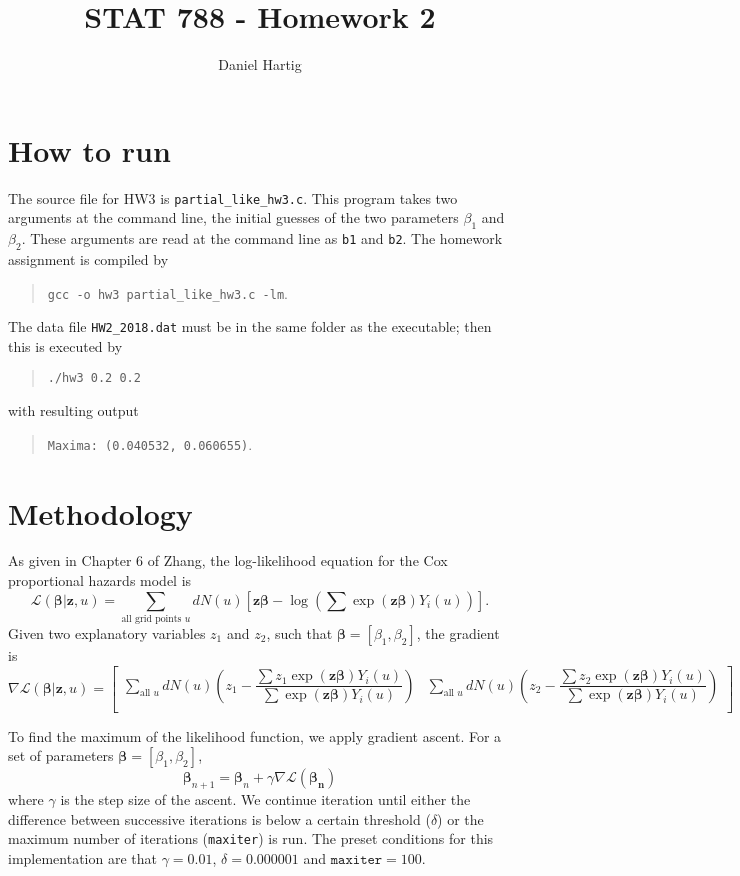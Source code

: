 \documentclass{article}
\title{STAT 788 - Homework 2}
\author{Daniel Hartig}
\begin{document}
\maketitle

\section{How to run}

The source file for HW3 is  \verb!partial_like_hw3.c!. This program takes two arguments at the command line, the initial guesses of the two parameters $\beta_1$ and $\beta_2$. These arguments are read at the command line as \verb!b1! and \verb!b2!. The homework assignment is compiled by
\begin{quote}\verb!gcc -o hw3 partial_like_hw3.c -lm!.\end{quote}
The data file \verb!HW2_2018.dat! must be in the same folder as the executable; then this is executed by 
\begin{quote}\verb!./hw3 0.2 0.2!\end{quote}
with resulting output 
\begin{quote}\verb!Maxima: (0.040532, 0.060655)!.\end{quote}

\section*{Methodology}

As given in Chapter 6 of Zhang, the log-likelihood equation for the Cox proportional hazards model is 
\[\mathcal{L}(\bm{\beta}|\bm{z}, u) = \sum_{\text{all grid points }u} dN(u) \left[\bm{z}\bm{\beta}-\log{\left(\sum\exp(\bm{z}\bm{\beta})Y_i(u)\right)}\right].\]
Given two explanatory variables $z_1$ and $z_2$, such that $\bm{\beta} = \left[\beta_1, \beta_2\right]$, the gradient is 
\[\nabla\mathcal{L}(\bm{\beta}|\bm{z}, u) = \begin{bmatrix}
\sum_{\text{all }u} dN(u)\left(z_1 - \dfrac{\sum z_1\exp(\bm{z}\bm{\beta})Y_i(u)}{\sum\exp(\bm{z}\bm{\beta})Y_i(u)}\right)&
\sum_{\text{all }u} dN(u)\left(z_2 - \dfrac{\sum z_2\exp(\bm{z}\bm{\beta})Y_i(u)}{\sum\exp(\bm{z}\bm{\beta})Y_i(u)}\right)\\
\end{bmatrix}\]

To find the maximum of the likelihood function, we apply gradient ascent. For a set of parameters $\bm{\beta} = \left[\beta_1, \beta_2\right]$, 
\[\bm{\beta}_{n+1} = \bm{\beta}_{n} + \gamma\nabla\mathcal{L}(\bm{\beta_n})\] 
where $\gamma$ is the step size of the ascent. We continue iteration until either the difference between successive iterations is below a certain threshold ($\delta$) or the maximum number of iterations (\texttt{maxiter}) is run. The preset conditions for this implementation are that $\gamma = 0.01$, $\delta = 0.000001$ and $\texttt{maxiter} = 100$.
\end{document}

